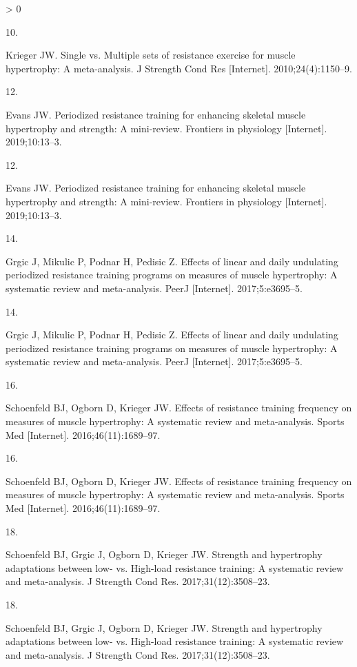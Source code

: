 \documentclass[twoside,10pt]{gihclass} %
\newlength{\cslhangindent}
\newlength{\csllabelwidth}
\newenvironment{CSLReferences}[3] %
 {%
  \setlength{\parindent}{0pt}
  \ifodd #1 \everypar{\setlength{\hangindent}{\cslhangindent}}\ignorespaces\fi
  \ifnum #2 > 0
  \setlength{\parskip}{#2\baselineskip}
  \fi
 }%
 {}
\newcommand{\CSLLeftMargin}[1]{\parbox[t]{\maxof{\widthof{#1}}{\csllabelwidth}}{#1}}
\newcommand{\CSLRightInline}[1]{\parbox[t]{\linewidth}{#1}}
\begin{document}
\begin{CSLReferences}{0}{0}
\leavevmode\hypertarget{ref-RN789}{}%
\CSLLeftMargin{10. }
\CSLRightInline{Krieger JW. Single vs. Multiple sets of resistance exercise for muscle hypertrophy: A meta-analysis. J Strength Cond Res {[}Internet{]}. 2010;24(4):1150--9. }

\leavevmode\hypertarget{ref-RN2575}{}%
\CSLLeftMargin{12. }
\CSLRightInline{Evans JW. Periodized resistance training for enhancing skeletal muscle hypertrophy and strength: A mini-review. Frontiers in physiology {[}Internet{]}. 2019;10:13--3. }

\leavevmode\hypertarget{ref-RN2575}{}%
\CSLLeftMargin{12. }
\CSLRightInline{Evans JW. Periodized resistance training for enhancing skeletal muscle hypertrophy and strength: A mini-review. Frontiers in physiology {[}Internet{]}. 2019;10:13--3. }

\leavevmode\hypertarget{ref-RN2572}{}%
\CSLLeftMargin{14. }
\CSLRightInline{Grgic J, Mikulic P, Podnar H, Pedisic Z. Effects of linear and daily undulating periodized resistance training programs on measures of muscle hypertrophy: A systematic review and meta-analysis. PeerJ {[}Internet{]}. 2017;5:e3695--5. }

\leavevmode\hypertarget{ref-RN2572}{}%
\CSLLeftMargin{14. }
\CSLRightInline{Grgic J, Mikulic P, Podnar H, Pedisic Z. Effects of linear and daily undulating periodized resistance training programs on measures of muscle hypertrophy: A systematic review and meta-analysis. PeerJ {[}Internet{]}. 2017;5:e3695--5. }

\leavevmode\hypertarget{ref-RN2571}{}%
\CSLLeftMargin{16. }
\CSLRightInline{Schoenfeld BJ, Ogborn D, Krieger JW. Effects of resistance training frequency on measures of muscle hypertrophy: A systematic review and meta-analysis. Sports Med {[}Internet{]}. 2016;46(11):1689--97. }

\leavevmode\hypertarget{ref-RN2571}{}%
\CSLLeftMargin{16. }
\CSLRightInline{Schoenfeld BJ, Ogborn D, Krieger JW. Effects of resistance training frequency on measures of muscle hypertrophy: A systematic review and meta-analysis. Sports Med {[}Internet{]}. 2016;46(11):1689--97. }

\leavevmode\hypertarget{ref-RN2569}{}%
\CSLLeftMargin{18. }
\CSLRightInline{Schoenfeld BJ, Grgic J, Ogborn D, Krieger JW. Strength and hypertrophy adaptations between low- vs. High-load resistance training: A systematic review and meta-analysis. J Strength Cond Res. 2017;31(12):3508--23. }

\leavevmode\hypertarget{ref-RN2569}{}%
\CSLLeftMargin{18. }
\CSLRightInline{Schoenfeld BJ, Grgic J, Ogborn D, Krieger JW. Strength and hypertrophy adaptations between low- vs. High-load resistance training: A systematic review and meta-analysis. J Strength Cond Res. 2017;31(12):3508--23. }


\end{CSLReferences}
\end{document}
